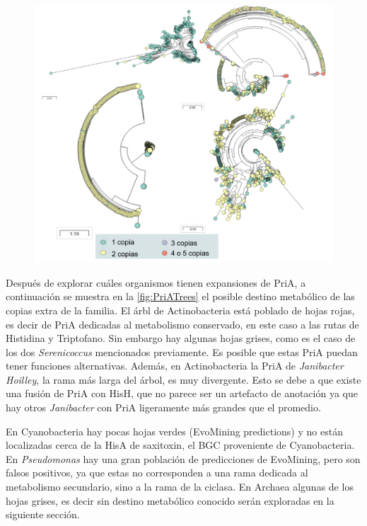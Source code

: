 \documentclass[]{article}
\begin{document}
\begin{figure}[h!tbp]
\centering
\includegraphics[angle = 0,scale = 0.8]{chapter4/PriAEvoMiningCopies.pdf}
\caption[Copias extras de PriA en Actinobacteria, Cyanobacteria, Pseudomonas y Archaea]{\footnotesize{}}
\label{fig:PriAEvoMiningCopies}
\end{figure}

Después de explorar cuáles organismos tienen expansiones de PriA, a
continuación se muestra en la \autoref{fig:PriATrees} el posible destino
metabólico de las copias extra de la familia. El árbl de Actinobacteria
está poblado de hojas rojas, es decir de PriA dedicadas al metabolismo
conservado, en este caso a las rutas de Histidina y Triptofano. Sin
embargo hay algunas hojas grises, como es el caso de los dos
\emph{Serenicoccus} mencionados previamente. Es posible que estas PriA
puedan tener funciones alternativas. Además, en Actinobacteria la PriA
de \emph{Janibacter Hoilley}, la rama más larga del árbol, es muy
divergente. Esto se debe a que existe una fusión de PriA con HisH, que
no parece ser un artefacto de anotación ya que hay otros
\emph{Janibacter} con PriA ligeramente más grandes que el promedio.

En Cyanobacteria hay pocas hojas verdes (EvoMining predictions) y no
están localizadas cerca de la HisA de saxitoxin, el BGC proveniente de
Cyanobacteria. En \emph{Pseudomonas} hay una gran población de
predicciones de EvoMining, pero son falsos positivos, ya que estas no
corresponden a una rama dedicada al metabolismo secundario, sino a la
rama de la ciclasa. En Archaea algunas de los hojas grises, es decir sin
destino metabólico conocido serán exploradas en la siguiente sección.
\end{document}
